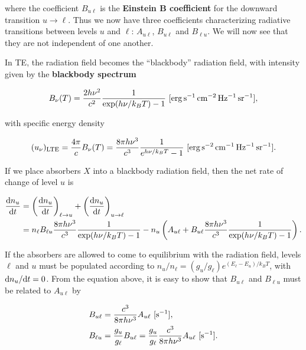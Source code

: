 \documentclass[a4paper,10pt]{article}
\begin{document}
{\noindent}where the coefficient $B_{u\ell}$ is the \textbf{Einstein B coefficient} for the downward transition $u\rightarrow\ell$. Thus we now have three coefficients characterizing radiative transitions between levels $u$ and $\ell$: $A_{u\ell}$, $B_{u\ell}$ and $B_{\ell u}$. We will now see that they are not independent of one another.

{\noindent}In TE, the radiation field becomes the ``blackbody'' radiation field, with intensity given by the \textbf{blackbody spectrum}

\begin{align*}
    B_\nu(T) = \frac{2h\nu^2}{c^2} \frac{1}{\exp(h\nu/k_BT) - 1} ~ [{\rm erg\,s^{-1}\,cm^{-2}\,Hz^{-1}\,sr^{-1}}],
\end{align*}

{\noindent}with specific energy density

\begin{align*}
    (u_\nu)_{\rm LTE} = \frac{4\pi}{c}B_\nu(T) = \frac{8\pi h\nu^3}{c^3}\frac{1}{e^{h\nu/k_BT}-1} ~ [{\rm erg\,s^{-2}\,cm^{-1}\,Hz^{-1}\,sr^{-1}}].
\end{align*}

{\noindent}If we place absorbers $X$ into a blackbody radiation field, then the net rate of change of level $u$ is

\begin{align*}
    \frac{{\rm d}n_u}{{\rm d}t} &= \left(\frac{{\rm d}n_u}{{\rm d}t}\right)_{\ell\rightarrow u} + \left(\frac{{\rm d}n_u}{{\rm d}t}\right)_{u\rightarrow\ell} \\
    &= n_\ell B_{\ell u}\frac{8\pi h\nu^3}{c^3} \frac{1}{\exp(h\nu/k_BT) - 1} - n_u \left(A_{u\ell}+B_{u\ell}\frac{8\pi h\nu^3}{c^3} \frac{1}{\exp(h\nu/k_BT) - 1}\right).
\end{align*}

{\noindent}If the absorbers are allowed to come to equilibrium with the radiation field, levels $\ell$ and $u$ must be populated according to $n_u/n_\ell = (g_u/g_\ell)e^{(E_\ell−E_u)/k_BT}$, with ${\rm d}n_u/{\rm d}t = 0$. From the equation above, it is easy to show that $B_{u\ell}$ and $B_{\ell u}$ must be related to $A_{u\ell}$ by

\begin{align*}
    B_{u\ell} &= \frac{c^3}{8\pi h\nu^3}A_{u\ell} ~ [{\rm s^{-1}}], \\
    B_{\ell u} &= \frac{g_u}{g_\ell}B_{u\ell} = \frac{g_u}{g_\ell}\frac{c^3}{8\pi h\nu^3} A_{u\ell} ~ [{\rm s^{-1}}].
\end{align*}
\end{document}
